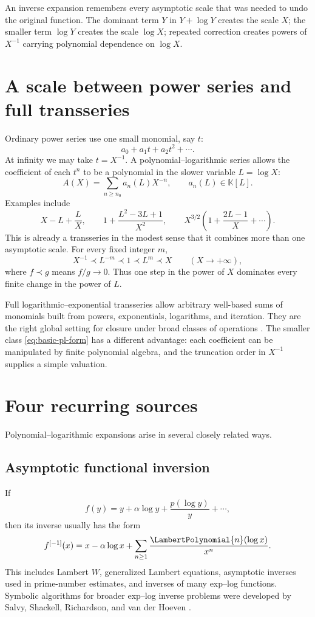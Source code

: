 \documentclass[11pt,openany]{book}
\theoremstyle{definition}
\theoremstyle{plain}
\theoremstyle{remark}
\newcommand{\K}{\mathbb{K}}
\begin{document}
\begin{intuitionbox}
An inverse expansion remembers every asymptotic scale that was needed to undo
the original function.  The dominant term \(Y\) in \(Y+\log Y\) creates the
scale \(X\); the smaller term \(\log Y\) creates the scale \(\log X\); repeated
correction creates powers of \(X^{-1}\) carrying polynomial dependence on
\(\log X\).
\end{intuitionbox}

\section{A scale between power series and full transseries}
Ordinary power series use one small monomial, say \(t\):
\[
 a_0+a_1t+a_2t^2+\cdots.
\]
At infinity we may take \(t=X^{-1}\).  A polynomial--logarithmic series allows
the coefficient of each \(t^n\) to be a polynomial in the slower variable
\(L=\log X\):
\begin{equation}\label{eq:basic-pl-form}
 A(X)=\sum_{n\ge n_0}a_n(L)X^{-n},
 \qquad a_n(L)\in\K[L].
\end{equation}
Examples include
\[
 X-L+\frac{L}{X},\qquad
 1+\frac{L^2-3L+1}{X^2},\qquad
 X^{3/2}\left(1+\frac{2L-1}{X}+\cdots\right).
\]
This is already a transseries in the modest sense that it combines more than
one asymptotic scale.  For every fixed integer \(m\),
\[
 X^{-1}\prec L^{-m}\prec 1\prec L^m\prec X
 \qquad (X\to+\infty),
\]
where \(f\prec g\) means \(f/g\to0\).  Thus one step in the power of \(X\)
dominates every finite change in the power of \(L\).

Full logarithmic--exponential transseries allow arbitrary well-based sums of
monomials built from powers, exponentials, logarithms, and iteration.  They are
the right global setting for closure under broad classes of operations
\cite{edgar-beginners,edgar-composition,vdhoeven-book,adh-book}.  The smaller
class \eqref{eq:basic-pl-form} has a different advantage: each coefficient can
be manipulated by finite polynomial algebra, and the truncation order in
\(X^{-1}\) supplies a simple valuation.

\section{Four recurring sources}
Polynomial--logarithmic expansions arise in several closely related ways.

\subsection{Asymptotic functional inversion}
If
\[
 f(y)=y+\alpha\log y+\frac{p(\log y)}{y}+\cdots,
\]
then its inverse usually has the form
\[
 f^{[-1]}(x)=x-\alpha\log x
 +\sum_{n\ge1}\frac{\LambertPolynomial{n}(\log x)}{x^n}.
\]
This includes Lambert \(W\), generalized Lambert equations, asymptotic
inverses used in prime-number estimates, and inverses of many exp--log
functions.  Symbolic algorithms for broader exp--log inverse problems were
developed by Salvy, Shackell, Richardson, and van der Hoeven
\cite{salvy-fast,salvy-shackell,rssv-exp-log}.
\end{document}
